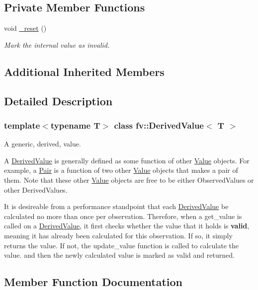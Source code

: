 \subsection*{Private Member Functions}
\begin{DoxyCompactItemize}
\item 
void \hyperlink{classfv_1_1DerivedValue_a5c296d4f3171797f31a3fab002dececa}{\+\_\+reset} ()
\begin{DoxyCompactList}\small\item\em Mark the internal value as invalid. \end{DoxyCompactList}\end{DoxyCompactItemize}
\subsection*{Additional Inherited Members}


\subsection{Detailed Description}
\subsubsection*{template$<$typename T$>$\newline
class fv\+::\+Derived\+Value$<$ T $>$}

A generic, derived, value. 

A \hyperlink{classfv_1_1DerivedValue}{Derived\+Value} is generally defined as some function of other \hyperlink{classfv_1_1Value}{Value} objects. For example, a \hyperlink{classfv_1_1Pair}{Pair} is a function of two other \hyperlink{classfv_1_1Value}{Value} objects that makes a pair of them. Note that these other \hyperlink{classfv_1_1Value}{Value} objects are free to be either Observed\+Values or other Derived\+Values.

It is desireable from a performance standpoint that each \hyperlink{classfv_1_1DerivedValue}{Derived\+Value} be calculated no more than once per observation. Therefore, when a get\+\_\+value is called on a \hyperlink{classfv_1_1DerivedValue}{Derived\+Value}, it first checks whether the value that it holds is {\bfseries valid}, meaning it has already been calculated for this observation. If so, it simply returns the value. If not, the update\+\_\+value function is called to calculate the value. and then the newly calculated value is marked as valid and returned. 

\subsection{Member Function Documentation}
\hypertarget{classfv_1_1DerivedValue_a5c296d4f3171797f31a3fab002dececa}{}\label{classfv_1_1DerivedValue_a5c296d4f3171797f31a3fab002dececa} 
